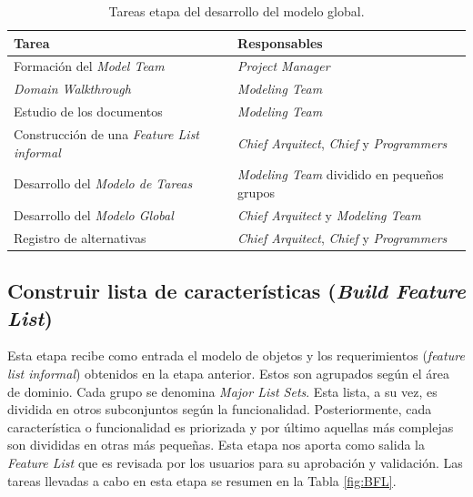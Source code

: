 \documentclass[11pt]{article}
\begin{document}
\begin{table}[H]
  \centering
\begin{tabular}{ |p{6cm}|p{6cm}|  }
	\hline
	Tarea & Responsables \\
	\hline
	Formación del
	\textit{Model Team}  &    \textit{Project
		Manager}\\
	
	\textit{Domain Walkthrough}  &    \textit{Modeling Team}\\
	
	Estudio de los documentos     &    \textit{Modeling Team}\\
	
	Construcción de una \textit{Feature List informal}  &    \textit{Chief Arquitect}, \textit{Chief} y \textit{Programmers}\\
	Desarrollo del \textit{Modelo de Tareas} & \textit{Modeling Team} dividido en pequeños grupos\\
	Desarrollo del \textit{Modelo Global}  &  \textit{Chief Arquitect} y \textit{Modeling Team}\\
	Registro de alternativas    & \textit{Chief Arquitect}, \textit{Chief} y \textit{Programmers}\\
	\hline
\end{tabular}
\caption{Tareas etapa del desarrollo del modelo global.}\label{fig:DOM}
\end{table}

\subsection {Construir lista de características (\textit{Build Feature List})}

Esta etapa recibe como entrada el modelo de objetos y los requerimientos (\textit{feature list informal}) obtenidos en la etapa anterior. Estos son agrupados según el área de dominio. Cada grupo se denomina \textit{Major List Sets}. Esta lista, a su vez, es dividida en otros subconjuntos según la funcionalidad. Posteriormente, cada característica o funcionalidad es priorizada y por último aquellas más complejas son divididas en otras más pequeñas. Esta etapa nos aporta como salida la \textit{Feature List} que es revisada por los usuarios para su aprobación y validación. Las tareas llevadas a cabo en esta etapa se resumen en la Tabla \ref{fig:BFL}. \\
\end{document}
